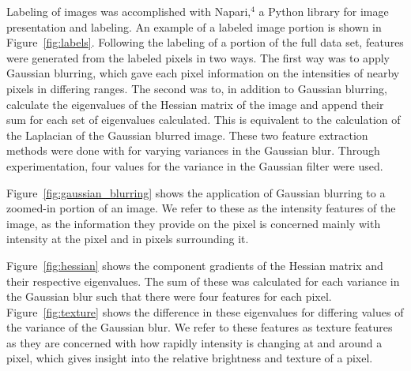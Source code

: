 \documentclass[12pt]{article}
\begin{document}
Labeling of images was accomplished with Napari,$^4$ a Python library for image presentation and 
labeling. An example of a labeled image portion is shown in Figure~\ref{fig:labels}. Following 
the labeling of a portion of the full data set, features were generated from the labeled pixels 
in two ways. The first way was to apply Gaussian blurring, which gave each pixel information on 
the intensities of nearby pixels in differing ranges. The second was to, in addition to Gaussian
blurring, calculate the eigenvalues of the Hessian matrix of the image and append their sum
for each set of eigenvalues calculated. This is equivalent to the calculation of the Laplacian of
the Gaussian blurred image. These two feature extraction methods were done with for varying 
variances in the Gaussian blur. Through experimentation, four values for the variance in the 
Gaussian filter were used. 

Figure~\ref{fig:gaussian_blurring} shows the application of Gaussian
blurring to a zoomed-in portion of an image. We refer to these as the intensity features of the image,
as the information they provide on the pixel is concerned mainly with intensity at the pixel and 
in pixels surrounding it.

Figure~\ref{fig:hessian} shows the component gradients of the Hessian matrix and their 
respective eigenvalues. The sum of these was calculated for each variance in the Gaussian blur
such that there were four features for each pixel. Figure~\ref{fig:texture} shows the difference
in these eigenvalues for differing values of the variance of the Gaussian blur. We refer to these
features as texture features as they are concerned with how rapidly intensity is changing at and
around a pixel, which gives insight into the relative brightness and texture of a pixel.
\end{document}
